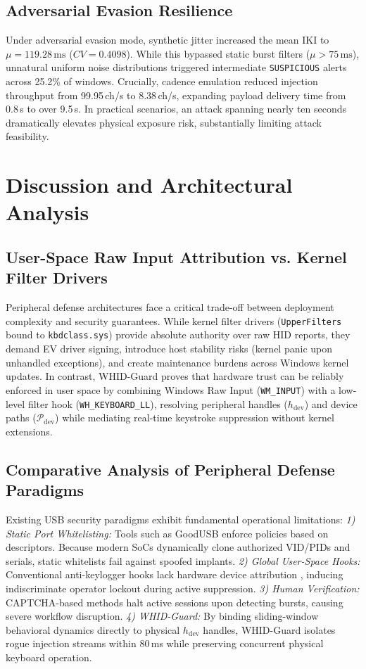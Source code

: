 \documentclass[conference]{IEEEtran}
\begin{document}
\subsection{Adversarial Evasion Resilience}
Under adversarial evasion mode, synthetic jitter increased the mean IKI to $\mu = 119.28\,\text{ms}$ ($CV = 0.4098$). While this bypassed static burst filters ($\mu > 75\,\text{ms}$), unnatural uniform noise distributions triggered intermediate \texttt{SUSPICIOUS} alerts across 25.2\% of windows. Crucially, cadence emulation reduced injection throughput from 99.95\,ch/s to 8.38\,ch/s, expanding payload delivery time from 0.8\,s to over 9.5\,s. In practical scenarios, an attack spanning nearly ten seconds dramatically elevates physical exposure risk, substantially limiting attack feasibility.

\section{Discussion and Architectural Analysis}

\subsection{User-Space Raw Input Attribution vs. Kernel Filter Drivers}
Peripheral defense architectures face a critical trade-off between deployment complexity and security guarantees. While kernel filter drivers (\texttt{UpperFilters} bound to \texttt{kbdclass.sys}) provide absolute authority over raw HID reports, they demand EV driver signing, introduce host stability risks (kernel panic upon unhandled exceptions), and create maintenance burdens across Windows kernel updates. In contrast, WHID-Guard proves that hardware trust can be reliably enforced in user space by combining Windows Raw Input (\texttt{WM\_INPUT}) with a low-level filter hook (\texttt{WH\_KEYBOARD\_LL}), resolving peripheral handles ($h_{\text{dev}}$) and device paths ($\mathcal{P}_{\text{dev}}$) while mediating real-time keystroke suppression without kernel extensions.

\subsection{Comparative Analysis of Peripheral Defense Paradigms}
Existing USB security paradigms exhibit fundamental operational limitations:
\textit{1) Static Port Whitelisting:} Tools such as GoodUSB \cite{tian2018hidev} enforce policies based on descriptors. Because modern SoCs dynamically clone authorized VID/PIDs and serials, static whitelists fail against spoofed implants.
\textit{2) Global User-Space Hooks:} Conventional anti-keylogger hooks lack hardware device attribution \cite{msdn_hooks}, inducing indiscriminate operator lockout during active suppression.
\textit{3) Human Verification:} CAPTCHA-based methods \cite{neuner2018keystroke} halt active sessions upon detecting bursts, causing severe workflow disruption.
\textit{4) WHID-Guard:} By binding sliding-window behavioral dynamics directly to physical $h_{\text{dev}}$ handles, WHID-Guard isolates rogue injection streams within 80\,ms while preserving concurrent physical keyboard operation.
\end{document}

